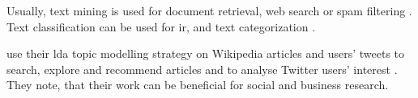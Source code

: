 Usually, text mining is used for document retrieval, web search or spam filtering \cite{clusteringDocs2020}.
Text classification can be used for \ac{ir}, and text categorization \cite{tfidf2008}.

\citeauthor{text_mining2016} use their \ac{lda} topic modelling strategy on Wikipedia articles and users' tweets to search, explore and recommend articles and to analyse Twitter users' interest \cite{text_mining2016}.
They note, that their work can be beneficial for social and business research.